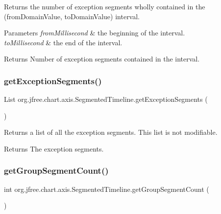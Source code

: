 Returns the number of exception segments wholly contained in the (from\+Domain\+Value, to\+Domain\+Value) interval.


\begin{DoxyParams}{Parameters}
{\em from\+Millisecond} & the beginning of the interval. \\
\hline
{\em to\+Millisecond} & the end of the interval.\\
\hline
\end{DoxyParams}
\begin{DoxyReturn}{Returns}
Number of exception segments contained in the interval. 
\end{DoxyReturn}
\mbox{\label{classorg_1_1jfree_1_1chart_1_1axis_1_1_segmented_timeline_a8f4d42ab1360a4a91287aa732f5922f6}} 
\subsubsection{\texorpdfstring{get\+Exception\+Segments()}{getExceptionSegments()}}
{\footnotesize\ttfamily List org.\+jfree.\+chart.\+axis.\+Segmented\+Timeline.\+get\+Exception\+Segments (\begin{DoxyParamCaption}{ }\end{DoxyParamCaption})}

Returns a list of all the exception segments. This list is not modifiable.

\begin{DoxyReturn}{Returns}
The exception segments. 
\end{DoxyReturn}
\mbox{\label{classorg_1_1jfree_1_1chart_1_1axis_1_1_segmented_timeline_adbb99ea00c66c4f4b810c7d2dde51417}} 
\subsubsection{\texorpdfstring{get\+Group\+Segment\+Count()}{getGroupSegmentCount()}}
{\footnotesize\ttfamily int org.\+jfree.\+chart.\+axis.\+Segmented\+Timeline.\+get\+Group\+Segment\+Count (\begin{DoxyParamCaption}{ }\end{DoxyParamCaption})}

